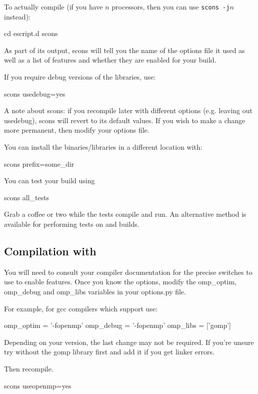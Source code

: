 To actually compile (if you have $n$ processors, then you can use \texttt{scons -j$n$} instead):

\begin{shellCode}
cd escript.d
scons
\end{shellCode}

As part of its output, scons will tell you the name of the options file it used as well as a list of features 
and whether they are enabled for your build.

If you require debug versions of the libraries, use:
\begin{shellCode}
 scons usedebug=yes
\end{shellCode}
A note about scons: if you recompile later with different options (e.g. leaving out usedebug), scons will revert 
to its default values. If you wish to make a change more permanent, then modify your options file.


You can install the binaries/libraries in a different location with:
\begin{shellCode}
 scons prefix=some_dir
\end{shellCode}

You can test your build using 
\begin{shellCode}
scons all_tests
\end{shellCode}
Grab a coffee or two while the tests compile and run.
An alternative method is available for performing tests on \openmp and \mpi builds.

\subsection{Compilation with \openmp}
You will need to consult your compiler documentation for the precise switches to use to enable \openmp features.
Once you know the options, modify the omp_optim, omp_debug and omp_libs variables in your options.py file.

For example, for gcc compilers which support \openmp use:
\begin{shellCode}
omp_optim		= '-fopenmp'
omp_debug		= '-fopenmp'
omp_libs		= ['gomp']
\end{shellCode}
Depending on your version, the last change may not be required.
If you're unsure try without the gomp library first and add it if you get linker errors.

Then recompile.
\begin{shellCode}
 scons useopenmp=yes
\end{shellCode}


